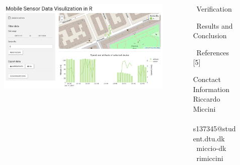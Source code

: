 \documentclass[final]{beamer}
\newlength{\onecolwid}
\newlength{\twocolwid}
\begin{document}
\begin{frame}[t]
\begin{columns}[t]
\begin{column}{\twocolwid}
		\begin{figure}
			\includegraphics[width=\twocolwid]{ss_ui.png}
		\end{figure}
	\end{column}

	\begin{column}{\onecolwid}
		\begin{block}{\faCheckCircle \, Verification}
			\lipsum[75]
			\lipsum[66]
		\end{block}

		\begin{block}{\faPieChart \, Results and Conclusion}
			\blindtext
		\end{block}

		\begin{block}{\faPaperclip \, References}
			[5]
		\end{block}

		\begin{alertblock}{ Conctact Information}
			\faUser \, Riccardo Miccini \\
			\faEnvelope \, s137345@student.dtu.dk \\
			\faGithub \, miccio-dk \\
			\faLinkedin \, rimiccini
		\end{alertblock}

		\begin{center}
			\ccbynd
		\end{center}

	\end{column}



\end{columns}
\end{frame}
\end{document}
